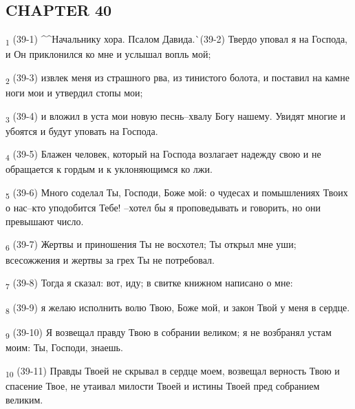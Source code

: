 \subsection{CHAPTER 40}
\begin{tcolorbox}
\textsubscript{1} (39-1) ^^Начальнику хора. Псалом Давида.^^ (39-2) Твердо уповал я на Господа, и Он приклонился ко мне и услышал вопль мой;
\end{tcolorbox}
\begin{tcolorbox}
\textsubscript{2} (39-3) извлек меня из страшного рва, из тинистого болота, и поставил на камне ноги мои и утвердил стопы мои;
\end{tcolorbox}
\begin{tcolorbox}
\textsubscript{3} (39-4) и вложил в уста мои новую песнь--хвалу Богу нашему. Увидят многие и убоятся и будут уповать на Господа.
\end{tcolorbox}
\begin{tcolorbox}
\textsubscript{4} (39-5) Блажен человек, который на Господа возлагает надежду свою и не обращается к гордым и к уклоняющимся ко лжи.
\end{tcolorbox}
\begin{tcolorbox}
\textsubscript{5} (39-6) Много соделал Ты, Господи, Боже мой: о чудесах и помышлениях Твоих о нас--кто уподобится Тебе! --хотел бы я проповедывать и говорить, но они превышают число.
\end{tcolorbox}
\begin{tcolorbox}
\textsubscript{6} (39-7) Жертвы и приношения Ты не восхотел; Ты открыл мне уши; всесожжения и жертвы за грех Ты не потребовал.
\end{tcolorbox}
\begin{tcolorbox}
\textsubscript{7} (39-8) Тогда я сказал: вот, иду; в свитке книжном написано о мне:
\end{tcolorbox}
\begin{tcolorbox}
\textsubscript{8} (39-9) я желаю исполнить волю Твою, Боже мой, и закон Твой у меня в сердце.
\end{tcolorbox}
\begin{tcolorbox}
\textsubscript{9} (39-10) Я возвещал правду Твою в собрании великом; я не возбранял устам моим: Ты, Господи, знаешь.
\end{tcolorbox}
\begin{tcolorbox}
\textsubscript{10} (39-11) Правды Твоей не скрывал в сердце моем, возвещал верность Твою и спасение Твое, не утаивал милости Твоей и истины Твоей пред собранием великим.
\end{tcolorbox}
